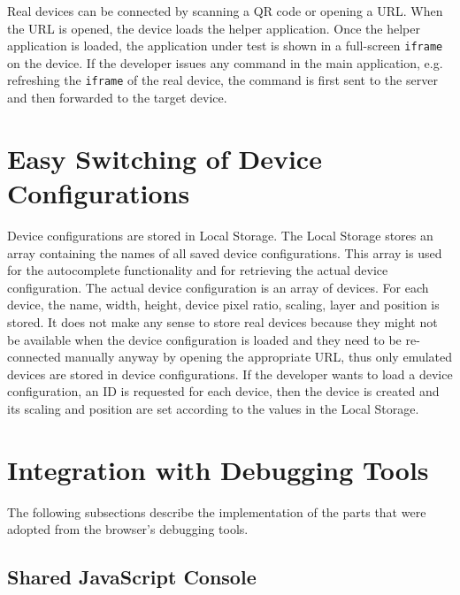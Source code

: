 Real devices can be connected by scanning a QR code or opening a URL. When the URL is opened, the device loads the helper application. Once the helper application is loaded, the application under test is shown in a full-screen \lstinline|iframe| on the device. If the developer issues any command in the main application, e.g. refreshing the \lstinline|iframe| of the real device, the command is first sent to the server and then forwarded to the target device. 

\section{Easy Switching of Device Configurations}

Device configurations are stored in Local Storage. The Local Storage stores an array containing the names of all saved device configurations. This array is used for the autocomplete functionality and for retrieving the actual device configuration. The actual device configuration is an array of devices. For each device, the name, width, height, device pixel ratio, scaling, layer and position is stored. It does not make any sense to store real devices because they might not be available when the device configuration is loaded and they need to be re-connected manually anyway by opening the appropriate URL, thus only emulated devices are stored in device configurations. If the developer wants to load a device configuration, an ID is requested for each device, then the device is created and its scaling and position are set according to the values in the Local Storage.

\section{Integration with Debugging Tools}

The following subsections describe the implementation of the parts that were adopted from the browser's debugging tools.

\subsection{Shared JavaScript Console}

